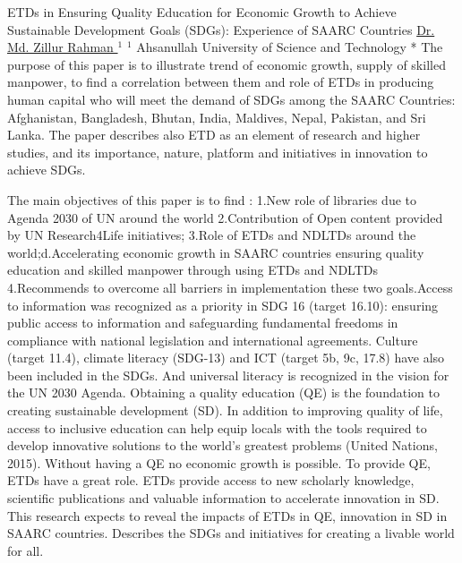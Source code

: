 
    \begin{abstract_online}{ ETDs in Ensuring Quality Education for Economic Growth to Achieve Sustainable Development Goals (SDGs):  Experience of SAARC Countries}{%
        \underline{ Dr. Md. Zillur Rahman }$^{1}$}{%
        }{%
        $^1$  Ahsanullah University of Science and Technology *\newline{}
            }
	The purpose of this paper is to illustrate trend of economic growth, supply of skilled manpower, to find a correlation between them and role of ETDs in producing human capital who will meet the demand of SDGs among the SAARC Countries: Afghanistan, Bangladesh, Bhutan, India, Maldives, Nepal, Pakistan, and Sri Lanka. The paper describes also ETD as an element of research and higher studies, and its importance, nature, platform and initiatives in innovation to achieve SDGs. 
	
	The main objectives of this paper is to find : 
	1.New role of libraries due to Agenda 2030 of UN around the world 
	2.Contribution of Open content provided by UN Research4Life initiatives;
	3.Role of ETDs and NDLTDs around the world;d.Accelerating economic growth in SAARC countries ensuring quality education and skilled manpower through using ETDs and NDLTDs
	4.Recommends to overcome all barriers in implementation these two goals.Access to information was recognized as a priority in SDG 16 (target 16.10): ensuring public access to information and safeguarding fundamental freedoms in compliance with national legislation and international agreements. Culture (target 11.4), climate literacy (SDG-13) and ICT (target 5b, 9c, 17.8) have also been included in the SDGs. And universal literacy is recognized in the vision for the UN 2030 Agenda. Obtaining a quality education (QE) is the foundation to creating sustainable development (SD). In addition to improving quality of life, access to inclusive education can help equip locals with the tools required to develop innovative solutions to the world’s greatest problems (United Nations, 2015). Without having a QE no economic growth is possible. To provide QE, ETDs have a great role. ETDs provide access to new scholarly knowledge, scientific publications and valuable information to accelerate innovation in SD. This research expects to reveal the impacts of ETDs in QE, innovation in SD in SAARC countries. Describes the SDGs and initiatives for creating a livable world for all. 
	

\end{abstract_online}

